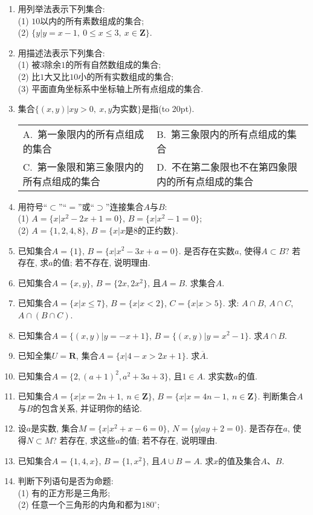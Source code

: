 \documentclass[10pt,a4paper]{article}
\newcommand{\bracket}[1]{(\hbox to #1pt{})}
\newcommand{\twoch}[4]{\par\begin{tabular}{p{.46\textwidth}p{.46\textwidth}}
A.~#1& B.~#2\\
C.~#3& D.~#4
\end{tabular}}
\begin{document}
\begin{enumerate}[1.]
\item 用列举法表示下列集合:\\
(1) $10$以内的所有素数组成的集合;\\
(2) $\{y|y=x-1,\  0\le x\le 3,\ x\in \mathbf{Z}\}$.
\item 用描述法表示下列集合:\\
(1) 被$3$除余$1$的所有自然数组成的集合;\\
(2) 比$1$大又比$10$小的所有实数组成的集合;\\
(3) 平面直角坐标系中坐标轴上所有点组成的集合.
\item 集合$\{(x, y)|xy>0, \ x,y\text{为实数}\}$是指\bracket{20}.
\twoch{第一象限内的所有点组成的集合}{第三象限内的所有点组成的集合}{第一象限和第三象限内的所有点组成的集合}{不在第二象限也不在第四象限内的所有点组成的集合}
\item 用符号``$\subset$''``$=$''或``$\supset$''连接集合$A$与$B$:\\
(1) $A=\{x|x^2-2x+1=0\}$, $B=\{x|x^2-1=0\}$;\\
(2) $A=\{1, 2, 4, 8\}$, $B=\{x|x$是$8$的正约数$\}$.
\item 已知集合$A=\{1\}$, $B=\{x|x^2-3x+a=0\}$. 是否存在实数$a$, 使得$A\subset B$?  若存在, 求$a$的值; 若不存在, 说明理由.
\item 已知集合$A=\{x, y\}$, $B=\{2x, 2x^2\}$, 且$A=B$. 求集合$A$.
\item 已知集合$A=\{x|x\le 7\}$, $B=\{x|x<2\}$, $C=\{x|x>5\}$. 求: $A\cap B$, $A\cap C$, $A\cap (B\cap C)$.
\item 已知集合$A=\{(x, y)|y=-x+1\}$, $B=\{(x, y)|y=x^2-1\}$. 求$A\cap B$.
\item 已知全集$U=\mathbf{R}$, 集合$A=\{x|4-x>2x+1\}$. 求$\overline A$.
\item 已知集合$A=\{2, (a+1)^2, a^2+3a+3\}$, 且$1\in A$. 求实数$a$的值.
\item 已知集合$A=\{x|x=2n+1,\ n\in \mathbf{Z}\}$, $B=\{x|x=4n-1,\ n\in \mathbf{Z}\}$. 判断集合$A$与$B$的包含关系, 并证明你的结论.
\item 设$a$是实数, 集合$M=\{x|x^2+x-6=0\}$, $N=\{y|ay+2=0\}$. 是否存在$a$, 使得$N\subset M$? 若存在, 求这些$a$的值; 若不存在, 说明理由.
\item 已知集合$A=\{1, 4, x\}$, $B=\{1, x^2\}$, 且$A\cup B=A$. 求$x$的值及集合$A$、$B$.
\item 判断下列语句是否为命题:\\
(1) 有的正方形是三角形;\\
(2) 任意一个三角形的内角和都为$180^\circ$;\\

\end{enumerate}
\end{document}
